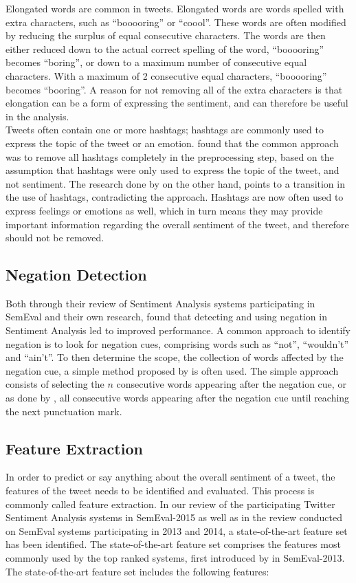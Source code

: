 Elongated words are common in tweets. Elongated words are words spelled with extra characters, such as ``booooring'' or ``coool''. These words are often modified by reducing the surplus of equal consecutive characters. The words are then either reduced down to the actual correct spelling of the word, ``booooring'' becomes ``boring'', or down to a maximum number of consecutive equal characters. With a maximum of 2 consecutive equal characters, ``booooring'' becomes ``booring''. A reason for not removing all of the extra characters is that elongation can be a form of expressing the sentiment, and can therefore be useful in the analysis. \\

Tweets often contain one or more hashtags; hashtags are commonly used to express the topic of the tweet or an emotion. \cite{SelmerBrevik} found that the common approach was to remove all hashtags completely in the preprocessing step, based on the assumption that hashtags were only used to express the topic of the tweet, and not sentiment. The research done by \cite{FaretReitan} on the other hand, points to a transition in the use of hashtags, contradicting the approach. Hashtags are now often used to express feelings or emotions as well, which in turn means they may provide important information regarding the overall sentiment of the tweet, and therefore should not be removed. 

\subsection*{Negation Detection}
Both through their review of Sentiment Analysis systems participating in SemEval and their own research, \cite{FaretReitan} found that detecting and using negation in Sentiment Analysis led to improved performance. A common approach to identify negation is to look for negation cues, comprising words such as ``not'', ``wouldn't'' and ``ain't''. To then determine the scope, the collection of words affected by the negation cue, a simple method proposed by \cite{Das01yahoo} is often used. The simple approach consists of selecting the $n$ consecutive words appearing after the negation cue, or as done by \cite{SelmerBrevik}, all consecutive words appearing after the negation cue until reaching the next punctuation mark.


\subsection{Feature Extraction}
In order to predict or say anything about the overall sentiment of a tweet, the features of the tweet needs to be identified and evaluated. This process is commonly called feature extraction. In our review of the participating Twitter Sentiment Analysis systems in SemEval-2015 as well as in the review \cite{FaretReitan} conducted on SemEval systems participating in 2013 and 2014, a state-of-the-art feature set has been identified. The state-of-the-art feature set comprises the features most commonly used by the top ranked systems, first introduced by \cite{MohammadKZ2013} in SemEval-2013. The state-of-the-art feature set includes the following features:


